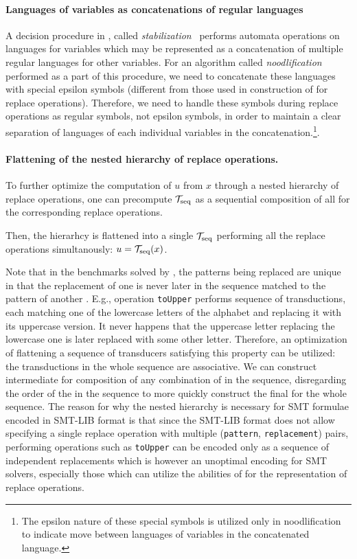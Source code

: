 \paragraph{Languages of variables as concatenations of regular languages}
A decision procedure in \noodler, called \emph{stabilization}~\cite{oopsla23_stabilization_DBLP:journals/pacmpl/ChenCHHLS23}
performs automata operations on languages for variables which may be represented as a concatenation of multiple regular languages for other variables.
For an algorithm called \emph{noodlification} performed as a part of this procedure, we need to concatenate these languages with special epsilon symbols (different from those used in construction of \nfts for replace operations).
Therefore, we need to handle these symbols during replace operations as regular symbols, not epsilon symbols, in order to maintain a clear separation of languages of each individual variables in the concatenation.\footnote{The epsilon nature of these special symbols is utilized only in noodlification to indicate move between languages of variables in the concatenated language.}.

\paragraph{Flattening of the nested hierarchy of replace operations.}
To further optimize the computation of $u$ from $x$ through a nested hierarchy of replace operations, one can precompute $\mathcal{T}_\text{seq}$ as a sequential composition of all \nfts for the corresponding replace operations.

Then, the hierarhcy is flattened into a single $\mathcal{T}_\text{seq}$ performing all the replace operations simultanously: $u = \mathcal{T}_\text{seq}(x)$.

Note that in the benchmarks solved by \noodler, the patterns being replaced are unique in that the replacement of one \nft is never later in the sequence matched to the pattern of another \nft.
E.g., operation \texttt{toUpper} performs sequence of transductions, each matching one of the lowercase letters of the alphabet and replacing it with its uppercase version.
It never happens that the uppercase letter replacing the lowercase one is later replaced with some other letter.
Therefore, an optimization of flattening a sequence of transducers satisfying this property can be utilized: the transductions in the whole sequence are associative.
We can construct intermediate \nfts for composition of any combination of \nfts in the sequence, disregarding the order of the \nfts in the sequence to more quickly construct the final \nfts for the whole sequence.
The reason for why the nested hierarchy is necessary for SMT formulae encoded in SMT-LIB format is that since the SMT-LIB format does not allow specifying a single replace operation with multiple (\texttt{pattern}, \texttt{replacement}) pairs, performing operations such as \texttt{toUpper} can be encoded only as a sequence of independent replacements which is however an unoptimal encoding for SMT solvers, especially those which can utilize the abilities of \nfts for the representation of replace operations.

